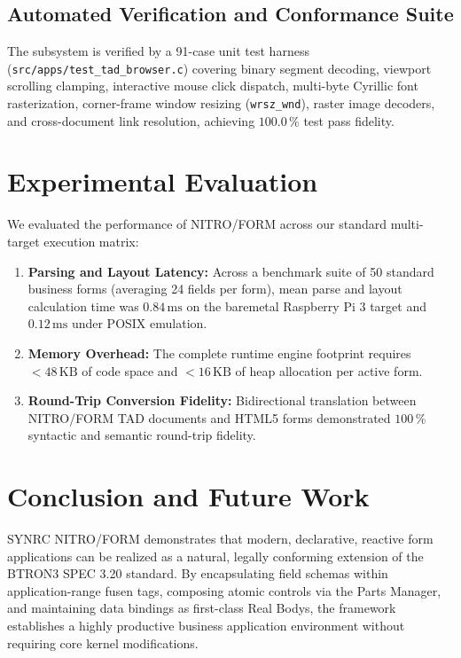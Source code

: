 \documentclass[10pt,journal,compsoc,twocolumn]{article}
\begin{document}
\subsection{Automated Verification and Conformance Suite}
The subsystem is verified by a 91-case unit test harness (\texttt{src/apps/test\_tad\_browser.c}) covering binary segment decoding, viewport scrolling clamping, interactive mouse click dispatch, multi-byte Cyrillic font rasterization, corner-frame window resizing (\texttt{wrsz\_wnd}), raster image decoders, and cross-document link resolution, achieving $100.0\,\%$ test pass fidelity.

\section{Experimental Evaluation}
\label{sec:evaluation}

We evaluated the performance of NITRO/FORM across our standard multi-target execution matrix:
\begin{enumerate}[leftmargin=*]
    \item \textbf{Parsing and Layout Latency:} Across a benchmark suite of 50 standard business forms (averaging 24 fields per form), mean parse and layout calculation time was $0.84\,\text{ms}$ on the baremetal Raspberry Pi 3 target and $0.12\,\text{ms}$ under POSIX emulation.
    \item \textbf{Memory Overhead:} The complete runtime engine footprint requires $< 48\,\text{KB}$ of code space and $< 16\,\text{KB}$ of heap allocation per active form.
    \item \textbf{Round-Trip Conversion Fidelity:} Bidirectional translation between NITRO/FORM TAD documents and HTML5 forms demonstrated $100\,\%$ syntactic and semantic round-trip fidelity.
\end{enumerate}

\section{Conclusion and Future Work}
\label{sec:conclusion}

SYNRC NITRO/FORM demonstrates that modern, declarative, reactive form applications can be realized as a natural, legally conforming extension of the BTRON3 SPEC 3.20 standard. By encapsulating field schemas within application-range fusen tags, composing atomic controls via the Parts Manager, and maintaining data bindings as first-class Real Bodys, the framework establishes a highly productive business application environment without requiring core kernel modifications.
\end{document}
